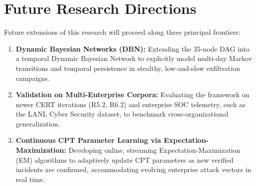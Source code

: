 \documentclass[12pt,a4paper]{report}
\begin{document}
\section{Future Research Directions}
Future extensions of this research will proceed along three principal frontiers:
\begin{enumerate}
    \item \textbf{Dynamic Bayesian Networks (DBN):} Extending the 35-node DAG into a temporal Dynamic Bayesian Network to explicitly model multi-day Markov transitions and temporal persistence in stealthy, low-and-slow exfiltration campaigns.
    \item \textbf{Validation on Multi-Enterprise Corpora:} Evaluating the framework on newer CERT iterations (R5.2, R6.2) and enterprise SOC telemetry, such as the LANL Cyber Security dataset, to benchmark cross-organizational generalization.
    \item \textbf{Continuous CPT Parameter Learning via Expectation-Maximization:} Developing online, streaming Expectation-Maximization (EM) algorithms to adaptively update CPT parameters as new verified incidents are confirmed, accommodating evolving enterprise attack vectors in real time.
\end{enumerate}
\end{document}
